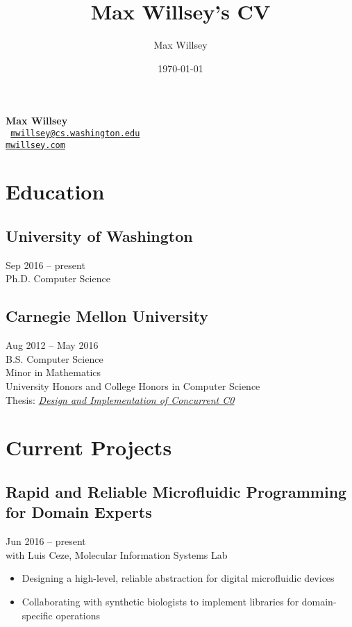 \documentclass{article}
\title{Max Willsey's CV}
\date{\today}
\author{Max Willsey}
\begin{document}
\begin{center}
  {\LARGE \bf Max Willsey} \\
  \vspace{1em}
  \tt
  \href{mailto:mwillsey@cs.washington.edu}{mwillsey@cs.washington.edu} \\
  \href{https://www.mwillsey.com}{mwillsey.com}
\end{center}

\section{Education}

\subsection{University of Washington}
\hfill Sep 2016 -- present \\
Ph.D. Computer Science

\subsection{Carnegie Mellon University}
\hfill Aug 2012 -- May 2016 \\
B.S. Computer Science \\
Minor in Mathematics \\
University Honors and College Honors in Computer Science \\
Thesis: \href{http://maxwillsey.com/papers/cc0-thesis.pdf}{\textit{Design and Implementation of Concurrent C0}}

\section{Current Projects}

\subsection{Rapid and Reliable Microfluidic Programming for Domain Experts}
\hfill Jun 2016 -- present \\
with Luis Ceze, Molecular Information Systems Lab
\begin{itemize}
\item Designing a high-level, reliable abstraction for digital microfluidic devices
\item Collaborating with synthetic biologists to implement libraries for domain-specific operations
\end{itemize}
\end{document}
